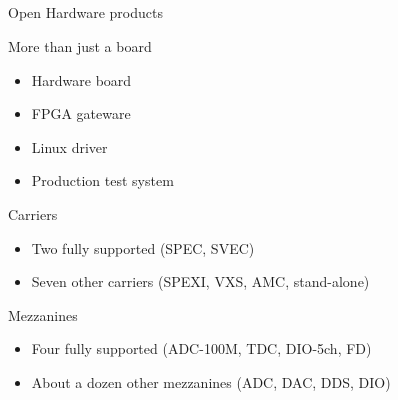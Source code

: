 \documentclass[compress,red]{beamer}
\begin{document}
\subsection*{} %

\begin{frame}{Open Hardware products}

  \begin{block}{More than just a board}
    \begin{itemize}
    \item Hardware board
    \item FPGA gateware
    \item Linux driver
    \item Production test system
    \end{itemize}
  \end{block}

  \begin{block}{Carriers}
    \begin{itemize}
    \item Two fully supported (SPEC, SVEC)
    \item Seven other carriers (SPEXI, VXS, AMC, stand-alone)
    \end{itemize}
  \end{block}


  \begin{block}{Mezzanines}
    \begin{itemize}
    \item Four fully supported (ADC-100M, TDC, DIO-5ch, FD)
    \item About a dozen other mezzanines (ADC, DAC, DDS, DIO)
    \end{itemize}
  \end{block}



\end{frame}
\end{document}
